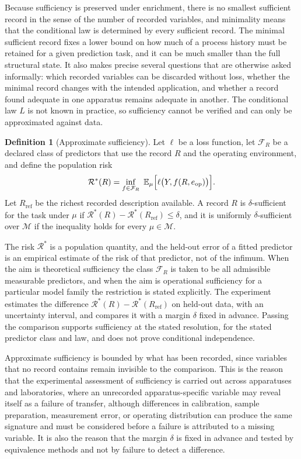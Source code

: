 \documentclass[11pt]{article}
\theoremstyle{definition}
\newtheorem{definition}{Definition}
\begin{document}
Because sufficiency is preserved under enrichment, there is no smallest sufficient record in the sense of the number of recorded variables, and minimality means that the conditional law is determined by every sufficient record. The minimal sufficient record fixes a lower bound on how much of a process history must be retained for a given prediction task, and it can be much smaller than the full structural state. It also makes precise several questions that are otherwise asked informally: which recorded variables can be discarded without loss, whether the minimal record changes with the intended application, and whether a record found adequate in one apparatus remains adequate in another. The conditional law $L$ is not known in practice, so sufficiency cannot be verified and can only be approximated against data.

\begin{definition}[Approximate sufficiency]
Let $\ell$ be a loss function, let $\mathcal{F}_R$ be a declared class of predictors that use the record $R$ and the operating environment, and define the population risk
\begin{equation}
\mathcal{R}^{\ast}(R)=\inf_{f\in\mathcal{F}_R}\ \mathbb{E}_{\mu}\Bigl[\ell\bigl(Y,f(R,e_{\mathrm{op}})\bigr)\Bigr].
\end{equation}
Let $R_{\mathrm{ref}}$ be the richest recorded description available. A record $R$ is $\delta$-sufficient for the task under $\mu$ if $\mathcal{R}^{\ast}(R)-\mathcal{R}^{\ast}(R_{\mathrm{ref}})\le\delta$, and it is uniformly $\delta$-sufficient over $\mathcal{M}$ if the inequality holds for every $\mu\in\mathcal{M}$.
\end{definition}

The risk $\mathcal{R}^{\ast}$ is a population quantity, and the held-out error of a fitted predictor is an empirical estimate of the risk of that predictor, not of the infimum. When the aim is theoretical sufficiency the class $\mathcal{F}_R$ is taken to be all admissible measurable predictors, and when the aim is operational sufficiency for a particular model family the restriction is stated explicitly. The experiment estimates the difference $\mathcal{R}^{\ast}(R)-\mathcal{R}^{\ast}(R_{\mathrm{ref}})$ on held-out data, with an uncertainty interval, and compares it with a margin $\delta$ fixed in advance. Passing the comparison supports sufficiency at the stated resolution, for the stated predictor class and law, and does not prove conditional independence.

Approximate sufficiency is bounded by what has been recorded, since variables that no record contains remain invisible to the comparison. This is the reason that the experimental assessment of sufficiency is carried out across apparatuses and laboratories, where an unrecorded apparatus-specific variable may reveal itself as a failure of transfer, although differences in calibration, sample preparation, measurement error, or operating distribution can produce the same signature and must be considered before a failure is attributed to a missing variable. It is also the reason that the margin $\delta$ is fixed in advance and tested by equivalence methods and not by failure to detect a difference.
\end{document}
